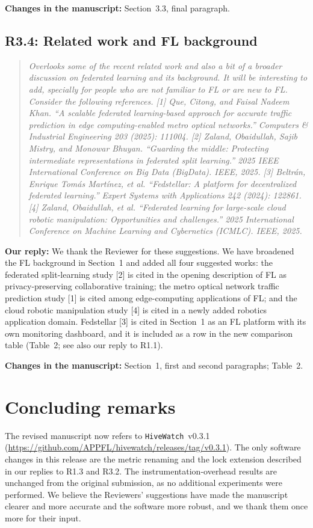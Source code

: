 \documentclass[11pt]{article}
\newenvironment{reviewer}{\begin{quote}\itshape\color{blue}}{\end{quote}}
\newcommand{\comment}[2]{\subsection*{R#1: #2}}
\newcommand{\response}{\noindent\textbf{Our reply:} }
\newcommand{\location}[1]{\noindent\textbf{Changes in the manuscript:} #1}
\newcommand{\HW}{\texttt{HiveWatch}}
\begin{document}
\location{Section~3.3, final paragraph.}

\comment{3.4}{Related work and FL background}
\begin{reviewer}
Overlooks some of the recent related work and also a bit of a broader discussion on federated learning and its background. It will be interesting to add, specially for people who are not familiar to FL or are new to FL. Consider the following references. [1] Que, Citong, and Faisal Nadeem Khan. ``A scalable federated learning-based approach for accurate traffic prediction in edge computing-enabled metro optical networks.'' Computers \& Industrial Engineering 203 (2025): 111004. [2] Zaland, Obaidullah, Sajib Mistry, and Monowar Bhuyan. ``Guarding the middle: Protecting intermediate representations in federated split learning.'' 2025 IEEE International Conference on Big Data (BigData). IEEE, 2025. [3] Beltr\'an, Enrique Tom\'as Mart\'inez, et al. ``Fedstellar: A platform for decentralized federated learning.'' Expert Systems with Applications 242 (2024): 122861. [4] Zaland, Obaidullah, et al. ``Federated learning for large-scale cloud robotic manipulation: Opportunities and challenges.'' 2025 International Conference on Machine Learning and Cybernetics (ICMLC). IEEE, 2025.
\end{reviewer}
\response We thank the Reviewer for these suggestions. We have broadened the FL background in Section~1 and added all four suggested works: the federated split-learning study [2] is cited in the opening description of FL as privacy-preserving collaborative training; the metro optical network traffic prediction study [1] is cited among edge-computing applications of FL; and the cloud robotic manipulation study [4] is cited in a newly added robotics application domain. Fedstellar [3] is cited in Section~1 as an FL platform with its own monitoring dashboard, and it is included as a row in the new comparison table (Table~2; see also our reply to R1.1).

\location{Section~1, first and second paragraphs; Table~2.}

\section*{Concluding remarks}
The revised manuscript now refers to \HW{}~v0.3.1 (\url{https://github.com/APPFL/hivewatch/releases/tag/v0.3.1}). The only software changes in this release are the metric renaming and the lock extension described in our replies to R1.3 and R3.2. The instrumentation-overhead results are unchanged from the original submission, as no additional experiments were performed. We believe the Reviewers' suggestions have made the manuscript clearer and more accurate and the software more robust, and we thank them once more for their input.
\end{document}
